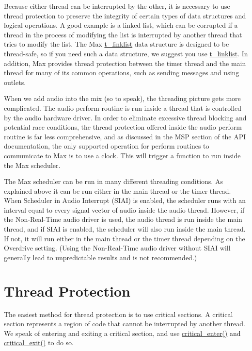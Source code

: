 Because either thread can be interrupted by the other, it is necessary to use thread protection to preserve the integrity of certain types of data structures and logical operations. A good example is a linked list, which can be corrupted if a thread in the process of modifying the list is interrupted by another thread that tries to modify the list. The Max \hyperlink{structt__linklist}{t\_\-linklist} data structure is designed to be thread-\/safe, so if you need such a data structure, we suggest you use \hyperlink{structt__linklist}{t\_\-linklist}. In addition, Max provides thread protection between the timer thread and the main thread for many of its common operations, such as sending messages and using outlets.

When we add audio into the mix (so to speak), the threading picture gets more complicated. The audio perform routine is run inside a thread that is controlled by the audio hardware driver. In order to eliminate excessive thread blocking and potential race conditions, the thread protection offered inside the audio perform routine is far less comprehensive, and as discussed in the MSP section of the API documentation, the only supported operation for perform routines to communicate to Max is to use a clock. This will trigger a function to run inside the Max scheduler.

The Max scheduler can be run in many different threading conditions. As explained above it can be run either in the main thread or the timer thread. When Scheduler in Audio Interrupt (SIAI) is enabled, the scheduler runs with an interval equal to every signal vector of audio inside the audio thread. However, if the Non-\/Real-\/Time audio driver is used, the audio thread is run inside the main thread, and if SIAI is enabled, the scheduler will also run inside the main thread. If not, it will run either in the main thread or the timer thread depending on the Overdrive setting. (Using the Non-\/Real-\/Time audio driver without SIAI will generally lead to unpredictable results and is not recommended.)\hypertarget{chapter_threading_chapter_threading_protection}{}\section{Thread Protection}\label{chapter_threading_chapter_threading_protection}
The easiest method for thread protection is to use critical sections. A critical section represents a region of code that cannot be interrupted by another thread. We speak of entering and exiting a critical section, and use \hyperlink{group__critical_ga246445cffc822f756ac6fb34a055022d}{critical\_\-enter()} and \hyperlink{group__critical_ga269f46fef96f91143fc1616a4105984c}{critical\_\-exit()} to do so.

